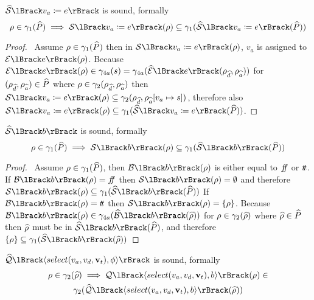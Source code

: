 \begin{conjecture}
    \label{thm:sound-assign}
    $\abssem{v_a \coloneqq e}$ is sound, formally
    \begin{equation*}
    \environment \in \concrete_1(\ab{P}) \implies \sem{v_a \coloneqq e}(\environment) \subseteq \concrete_1(\abssem{v_a \coloneqq e}(\ab{P}))
    \end{equation*}
\end{conjecture}


\begin{proof}
    \pf\
    Assume $\rho \in \gamma_1(\widehat{P})$ then in $\sem{v_a \coloneqq e}(\environment)$, $v_a$ is assigned to $\expsem{e}(\environment)$.
    Because $\expsem{e}(\environment) \in \concrete_{4a}(s) = \concrete_{4a}(\absexpsem{e}(\env{\ab{d}}, \env{\ab{a}}))$ for $(\rho_{\widehat{d}}, \rho_{\widehat{a}}) \in \widehat{P}$ where $\rho \in \gamma_2(\rho_{\widehat{d}}, \rho_{\widehat{a}})$ then $\sem{v_a \coloneqq e}(\environment) \subseteq \concrete_2(\env{\ab{d}}, \env{\ab{a}}[v_a \mapsto s])$, therefore also $\sem{v_a \coloneqq e}(\environment) \subseteq \concrete_1(\abssem{v_a \coloneqq e}(\ab{P}))$.
\end{proof}


\begin{conjecture}
    \label{thm:sound-boolsem}
    $\abssem{b}$ is sound, formally
    \begin{equation*}
    \environment \in \concrete_1(\ab{P}) \implies \sem{b}(\environment) \subseteq \concrete_1(\abssem{b}(\ab{P}))
    \end{equation*}
\end{conjecture}


\begin{proof}
    \pf\
    Assume $\rho \in \gamma_1(\widehat{P})$, then $\boolsem{b}(\environment)$ is either equal to $f\!\!f$ or $t\!t$.
    If $\boolsem{b}(\environment) = \false$ then $\sem{b}(\environment) = \emptyset$ and therefore $\sem{b}(\environment) \subseteq \concrete_1(\abssem{b}(\ab{P}))$
    If $\boolsem{b}(\environment) = \true$ then $\sem{b}(\environment) = \{ \environment \}$.
    Because $\boolsem{b}(\environment) \in \concrete_{4a}(\absboolsem{b}(\ab{\environment}))$ for $\rho \in \gamma_2(\widehat{\rho})$ where $\widehat{\rho} \in \widehat{P}$ then $\widehat{\rho}$ must be in $\abssem{b}(\ab{P})$, and therefore $\{ \environment \} \subseteq \concrete_1(\abssem{b}(\ab{\environment}))$
\end{proof}


\begin{conjecture}
    \label{thm:sound-select}
    $\abssqlsem{\langle select(v_a, v_d, \mathbf{v}_t), \phi \rangle}$ is sound, formally
    \begin{multline*}
        \environment \in \concrete_2(\ab{\environment}) \implies \sqlsem{\langle select(v_a, v_d, \mathbf{v}_t), b \rangle}(\environment) \in \\
        \concrete_2(\abssqlsem{\langle select(v_a, v_d, \mathbf{v}_t), b \rangle}(\ab{\environment}))
    \end{multline*}
\end{conjecture}


